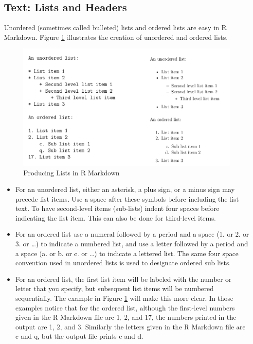 \documentclass[]{krantz}
\theoremstyle{definition}
\theoremstyle{definition}
\theoremstyle{definition}
\theoremstyle{remark}
\begin{document}
\subsection{Text: Lists and Headers}\label{text-lists-and-headers}

Unordered (sometimes called bulleted) lists and ordered lists are easy
in R Markdown. Figure \ref{fig:lists} illustrates the creation of
unordered and ordered lists.

\begin{figure}

{\centering \includegraphics[width=1\linewidth]{03-scripts/03-images/listsPic} 

}

\caption{Producing Lists in R Markdown}\label{fig:lists}
\end{figure}

\begin{itemize}
\item
  For an unordered list, either an asterisk, a plus sign, or a minus
  sign may precede list items. Use a space after these symbols before
  including the list text. To have second-level items (sub-lists) indent
  four spaces before indicating the list item. This can also be done for
  third-level items.
\item
  For an ordered list use a numeral followed by a period and a space (1.
  or 2. or 3. or \ldots{}) to indicate a numbered list, and use a letter
  followed by a period and a space (a. or b. or c. or \ldots{}) to
  indicate a lettered list. The same four space convention used in
  unordered lists is used to designate ordered sub lists.
\item
  For an ordered list, the first list item will be labeled with the
  number or letter that you specify, but subsequent list items will be
  numbered sequentially. The example in Figure \ref{fig:lists} will make
  this more clear. In those examples notice that for the ordered list,
  although the first-level numbers given in the R Markdown file are 1,
  2, and 17, the numbers printed in the output are 1, 2, and 3.
  Similarly the letters given in the R Markdown file are c and q, but
  the output file prints c and d.
\end{itemize}
\end{document}
